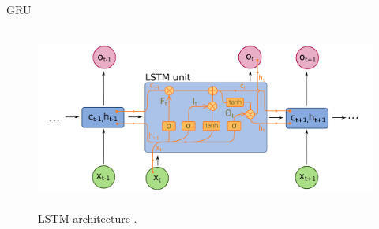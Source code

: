 \documentclass[a4paper, 11pt]{article}
\begin{document}
GRU \parencite{cho2014learning}

\begin{figure}[htpb!]
    \centering
    \includegraphics[width=\textwidth,height=6cm,keepaspectratio=true]
    {lstm-1.png}
    \caption{
        LSTM architecture \parencite{rnn-2}.
    }
    \label{fig:LSTM architecture}
\end{figure}

\end{document}
